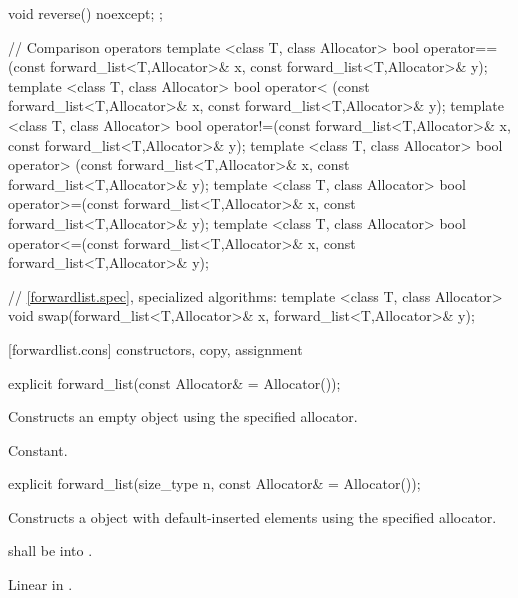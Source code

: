 \begin{codeblock}
{{    void reverse() noexcept;
  };

  // Comparison operators
  template <class T, class Allocator>
    bool operator==(const forward_list<T,Allocator>& x, const forward_list<T,Allocator>& y);
  template <class T, class Allocator>
    bool operator< (const forward_list<T,Allocator>& x, const forward_list<T,Allocator>& y);
  template <class T, class Allocator>
    bool operator!=(const forward_list<T,Allocator>& x, const forward_list<T,Allocator>& y);
  template <class T, class Allocator>
    bool operator> (const forward_list<T,Allocator>& x, const forward_list<T,Allocator>& y);
  template <class T, class Allocator>
    bool operator>=(const forward_list<T,Allocator>& x, const forward_list<T,Allocator>& y);
  template <class T, class Allocator>
    bool operator<=(const forward_list<T,Allocator>& x, const forward_list<T,Allocator>& y);

  // \ref{forwardlist.spec}, specialized algorithms:
  template <class T, class Allocator>
    void swap(forward_list<T,Allocator>& x, forward_list<T,Allocator>& y);
}
\end{codeblock}

[forwardlist.cons]{ constructors, copy, assignment}

%
%
\begin{itemdecl}
explicit forward_list(const Allocator& = Allocator());
\end{itemdecl}

\begin{itemdescr}
\pnum
\effects Constructs an empty  object using the specified allocator.

\pnum
\complexity Constant.
\end{itemdescr}

%
%
\begin{itemdecl}
explicit forward_list(size_type n, const Allocator& = Allocator());
\end{itemdecl}

\begin{itemdescr}
\pnum
\effects Constructs a  object with 
default-inserted elements using the specified allocator.

\pnum
\requires {} shall be  into .

\pnum
\complexity Linear in .
\end{itemdescr}


